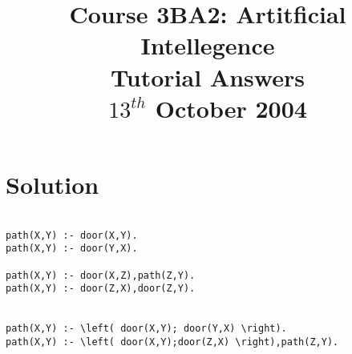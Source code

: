 \documentclass[a4paper,12pt]{article}
\begin{document}
\title{Course 3BA2: Artitficial Intellegence \\ Tutorial Answers \\ $13^{th}$ October 2004}

\maketitle

\section{Solution}

\begin{verbatim}

path(X,Y) :- door(X,Y).
path(X,Y) :- door(Y,X).

path(X,Y) :- door(X,Z),path(Z,Y).
path(X,Y) :- door(Z,X),door(Z,Y).


path(X,Y) :- \left( door(X,Y); door(Y,X) \right).
path(X,Y) :- \left( door(X,Y);door(Z,X) \right),path(Z,Y).

\end{verbatim}
\end{document}
